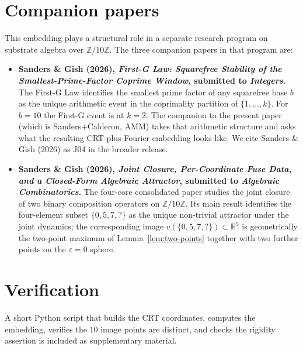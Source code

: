 \documentclass[11pt,reqno]{amsart}
\theoremstyle{definition}
\newcommand{\Z}{\mathbb{Z}}
\newcommand{\R}{\mathbb{R}}
\begin{document}
\section{Companion papers}
\label{sec:companions}

This embedding plays a structural role in a separate research
program on substrate algebra over $\Z/10\Z$. The three
companion papers in that program are:

\begin{itemize}[leftmargin=*]
\item \textbf{Sanders \& Gish (2026), \emph{First-G Law: Squarefree
  Stability of the Smallest-Prime-Factor Coprime Window},
  submitted to \emph{Integers}.} The First-G Law identifies the
  smallest prime factor of any squarefree base $b$ as the unique
  arithmetic event in the coprimality partition of
  $\{1, \ldots, k\}$. For $b = 10$ the First-G event is at
  $k = 2$. The companion to the present paper (which is
  Sanders+Calderon, AMM) takes that arithmetic structure and asks
  what the resulting CRT-plus-Fourier embedding looks like. We
  cite Sanders \& Gish (2026) as J04 in the broader release.
\item \textbf{Sanders \& Gish (2026), \emph{Joint Closure,
  Per-Coordinate Fuse Data, and a Closed-Form Algebraic Attractor},
  submitted to \emph{Algebraic Combinatorics}.} The four-core
  consolidated paper studies the joint closure of two binary
  composition operators on $\Z/10\Z$. Its main result identifies
  the four-element subset $\{0, 5, 7, ?\}$ as the unique non-trivial
  attractor under the joint dynamics; the corresponding image
  $v(\{0,5,7,?\}) \subset \R^5$ is geometrically the two-point
  maximum of Lemma~\ref{lem:two-points} together with two further
  points on the $\varepsilon = 0$ sphere.
\end{itemize}

\section*{Verification}

A short Python script that builds the CRT coordinates, computes
the embedding, verifies the $10$ image points are distinct, and
checks the rigidity assertion is included as supplementary
material.
\end{document}
